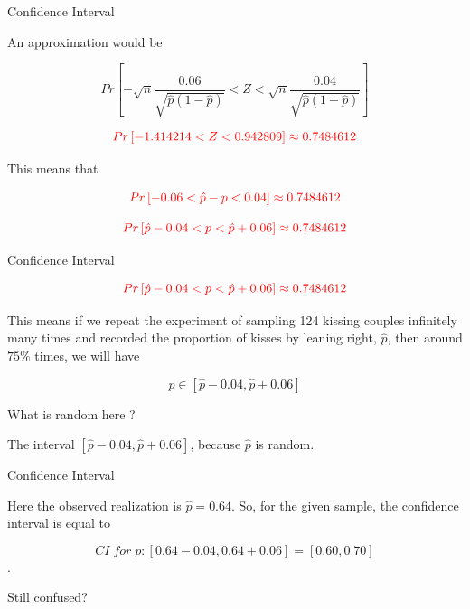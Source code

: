 \documentclass{beamer}\usepackage[]{graphicx}\usepackage[]{color}
\begin{document}
\begin{frame}{Confidence Interval}

An approximation would be 

$$ Pr \left [ -\sqrt{n}\frac{0.06}{\sqrt{\hat{p}(1-\hat{p})}} < Z < \sqrt{n} \frac{0.04}{\sqrt{\hat{p}(1-\hat{p})}} \right ] $$

$$ \textcolor{red}{Pr \left [ -1.414214 < Z < 0.942809 \right ] \approx 0.7484612} $$

This means that 

$$ \textcolor{red}{Pr \left [ -0.06 < \hat{p} - p < 0.04 \right ] \approx 0.7484612} $$

$$ \textcolor{red}{Pr \left [\hat{p} - 0.04 < p < \hat{p} + 0.06 \right ] \approx 0.7484612} $$


\end{frame}

\begin{frame}{Confidence Interval}

$$ \textcolor{red}{Pr \left [\hat{p} - 0.04 < p < \hat{p} + 0.06 \right ] \approx 0.7484612} $$ \pause \newline

This means if we repeat the experiment of sampling 124 kissing couples infinitely many times and recorded the proportion of kisses by leaning right, $\hat{p}$, then around $75 \%$ times, we will have 

$$ p \in \left [ \hat{p} - 0.04, \hat{p} + 0.06  \right ] $$ \pause \newline

What is random here ? \pause \newline

The interval $\left [ \hat{p} - 0.04, \hat{p} + 0.06  \right ]$, because $\hat{p}$ is random.  \pause \newline

\end{frame}

\begin{frame}{Confidence Interval}

Here the observed realization is $\hat{p}=0.64$. So, for the given sample, the confidence interval is equal to 

$$ CI \; for \; p : \left [ 0.64 - 0.04, 0.64 + 0.06 \right] = \left[ 0.60, 0.70 \right]$$.
\pause \newline

Still confused? \pause \newline

\end{frame}
\end{document}
